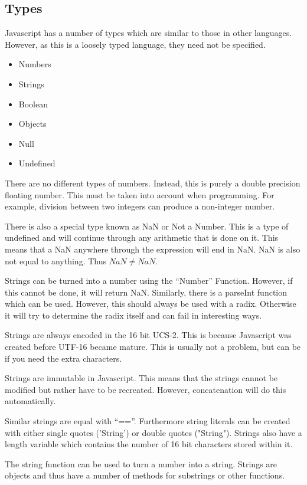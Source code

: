 		\subsection{Types}
			Javascript has a number of types which are similar to those in other languages. 
			However, as this is a loosely typed language, they need not be specified. 
			\begin{itemize}
				\item Numbers
				\item Strings
				\item Boolean
				\item Objects
				\item Null
				\item Undefined
			\end{itemize}
			There are no different types of numbers. 
			Instead, this is purely a double precision floating number. 
			This must be taken into account when programming. 
			For example, division between two integers can produce a non-integer number. 

			There is also a special type known as NaN or Not a Number. 
			This is a type of undefined and will continue through any arithmetic that is done on it. 
			This means that a NaN anywhere through the expression will end in NaN. 
			NaN is also not equal to anything. 
			Thus $NaN \ne NaN$. 
			
			Strings can be turned into a number using the ``Number'' Function. 
			However, if this cannot be done, it will return NaN. 
			Similarly, there is a parseInt function which can be used. 
			However, this should always be used with a radix. 
			Otherwise it will try to determine the radix itself and can fail in interesting ways. 

			Strings are always encoded in the 16 bit UCS-2. 
			This is because Javascript was created before UTF-16 became mature. 
			This is usually not a problem, but can be if you need the extra characters. 

			Strings are immutable in Javascript. 
			This means that the strings cannot be modified but rather have to be recreated. 
			However, concatenation will do this automatically. 

			Similar strings are equal with ``==''. 
			Furthermore string literals can be created with either single quotes ('String') or double quotes ("String"). 
			Strings also have a length variable which contains the number of 16 bit characters stored within it. 

			The string function can be used to turn a number into a string. 
			Strings are objects and thus have a number of methods for substrings or other functions. 

